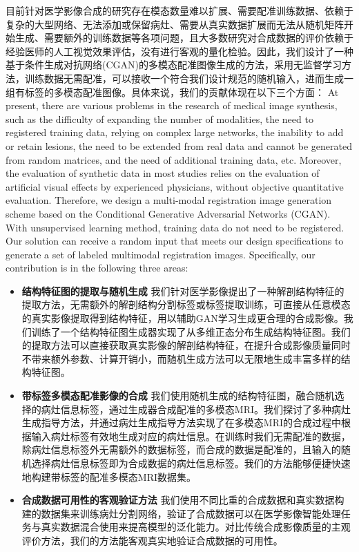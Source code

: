 \documentclass[letterpaper]{article} %
\begin{document}
目前针对医学影像合成的研究存在模态数量难以扩展、需要配准训练数据、依赖于复杂的大型网络、无法添加或保留病灶、需要从真实数据扩展而无法从随机矩阵开始生成、需要额外的训练数据等各项问题，且大多数研究对合成数据的评价依赖于经验医师的人工视觉效果评估，没有进行客观的量化检验。因此，我们设计了一种基于条件生成对抗网络(CGAN)\cite{70mirza2014conditional}的多模态配准图像生成的方法，采用无监督学习方法，训练数据无需配准，可以接收一个符合我们设计规范的随机输入，进而生成一组有标签的多模态配准图像。具体来说，我们的贡献体现在以下三个方面：
At present, there are various problems in the research of medical image synthesis, such as the difficulty of expanding the number of modalities, the need to registered training data, relying on complex large networks, the inability to add or retain lesions, the need to be extended from real data and cannot be generated from random matrices, and the need of additional training data, etc. Moreover, the evaluation of synthetic data in most studies relies on the evaluation of artificial visual effects by experienced physicians, without objective quantitative evaluation. Therefore, we design a multi-modal registration image generation scheme based on the Conditional Generative Adversarial Networks (CGAN)\cite{70mirza2014conditional}. With unsupervised learning method, training data do not need to be registered. Our solution can receive a random input that meets our design specifications to generate a set of labeled multimodal registration images. Specifically, our contribution is in the following three areas:

\begin{itemize}
\item \textbf{结构特征图的提取与随机生成}
我们针对医学影像提出了一种解剖结构特征的提取方法，无需额外的解剖结构分割标签或标签提取训练，可直接从任意模态的真实影像提取得到结构特征，用以辅助GAN学习生成更合理的合成影像。我们训练了一个结构特征图生成器实现了从多维正态分布生成结构特征图。我们的提取方法可以直接获取真实影像的解剖结构特征，在提升合成影像质量同时不带来额外参数、计算开销小，而随机生成方法可以无限地生成丰富多样的结构特征图。
\item \textbf{带标签多模态配准影像的合成}
我们使用随机生成的结构特征图，融合随机选择的病灶信息标签，通过生成器合成配准的多模态MRI。我们探讨了多种病灶生成指导方法，并通过病灶生成指导方法实现了在多模态MRI的合成过程中根据输入病灶标签有效地生成对应的病灶信息。在训练时我们无需配准的数据，除病灶信息标签外无需额外的数据标签，而合成的数据是配准的，且输入的随机选择病灶信息标签即为合成数据的病灶信息标签。我们的方法能够便捷快速地构建带标签的配准多模态MRI数据集。
\item \textbf{合成数据可用性的客观验证方法}
我们使用不同比重的合成数据和真实数据构建的数据集来训练病灶分割网络，验证了合成数据可以在医学影像智能处理任务与真实数据混合使用来提高模型的泛化能力。对比传统合成影像质量的主观评价方法，我们的方法能客观真实地验证合成数据的可用性。
\end{itemize}
\end{document}
